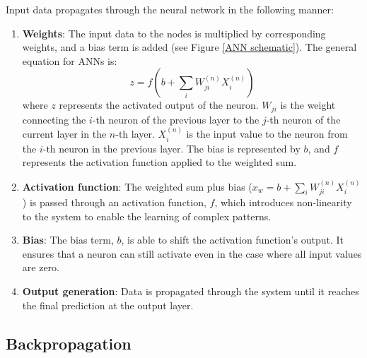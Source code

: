 Input data propagates through the neural network in the following manner:
\begin{enumerate}
	\item \textbf{Weights}: The input data to the nodes is multiplied by corresponding weights, and a bias term is added (see Figure \ref{ANN schematic}). The general equation for ANNs is:
	\begin{equation}\label{Generalised ANN1}
		z = f(b+\sum_i W_{j i}^{(n)} X_i^{(n)})
	\end{equation}
	where $z$ represents the activated output of the neuron. $W_{j i}$ is the weight connecting the $i$-th neuron of the previous layer to the $j$-th neuron of the current layer in the $n$-th layer. $X_i^{(n)}$ is the input value to the neuron from the $i$-th neuron in the previous layer. The bias is represented by $b$, and $f$ represents the activation function applied to the weighted sum.
	
	\item \textbf{Activation function}: The weighted sum plus bias ($x_w = b+\sum_i W_{j i}^{(n)} X_i^{(n)}$) is passed through an activation function, $f$, which introduces non-linearity to the system to enable the learning of complex patterns.
	
	\item \textbf{Bias}: The bias term, $b$, is able to shift the activation function's output. It ensures that a neuron can still activate even in the case where all input values are zero.
	
	\item \textbf{Output generation}: Data is propagated through the system until it reaches the final prediction at the output layer.
\end{enumerate}

\subsection{Backpropagation}

